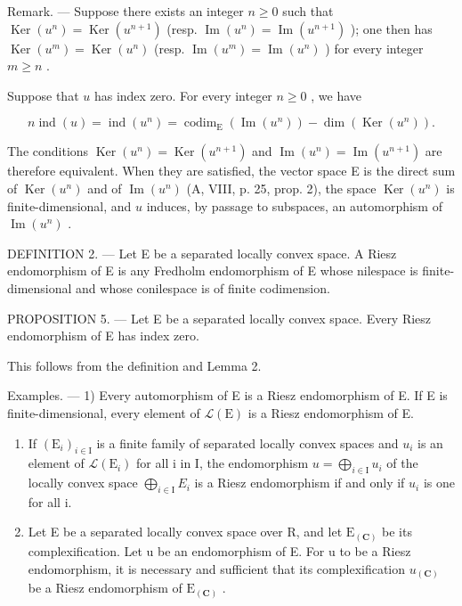 Remark. --- Suppose there exists an integer \(n \geqslant 0\) such that \(\operatorname{Ker}(u^{n}) = \operatorname{Ker}(u^{n+1})\) (resp. \(\operatorname{Im}(u^{n}) = \operatorname{Im}(u^{n+1})\) ); one then has \(\operatorname{Ker}(u^{m}) = \operatorname{Ker}(u^{n})\) (resp. \(\operatorname{Im}(u^{m}) = \operatorname{Im}(u^{n})\) ) for every integer \(m \geqslant n\) .

Suppose that \(u\) has index zero. For every integer \(n \geqslant 0\) , we have

\[
n \operatorname{ind} (u) = \operatorname{ind} \left(u ^ {n}\right) = \operatorname{codim} _ {\mathrm{E}} \left(\operatorname{Im} \left(u ^ {n}\right)\right) - \dim \left(\operatorname{Ker} \left(u ^ {n}\right)\right).
\]

The conditions \(\operatorname{Ker}(u^n) = \operatorname{Ker}(u^{n+1})\) and \(\operatorname{Im}(u^n) = \operatorname{Im}(u^{n+1})\) are therefore equivalent. When they are satisfied, the vector space E is the direct sum of \(\operatorname{Ker}(u^n)\) and of \(\operatorname{Im}(u^n)\) (A, VIII, p. 25, prop. 2), the space \(\operatorname{Ker}(u^n)\) is finite-dimensional, and \(u\) induces, by passage to subspaces, an automorphism of \(\operatorname{Im}(u^n)\) .

DEFINITION 2. --- Let E be a separated locally convex space. A Riesz endomorphism of E is any Fredholm endomorphism of E whose nilespace is finite-dimensional and whose conilespace is of finite codimension.

PROPOSITION 5. --- Let E be a separated locally convex space. Every Riesz endomorphism of E has index zero.

This follows from the definition and Lemma 2.

Examples. --- 1) Every automorphism of E is a Riesz endomorphism of E. If E is finite-dimensional, every element of \(\mathcal{L}(\mathrm{E})\) is a Riesz endomorphism of E.

\begin{enumerate}
\def\labelenumi{\arabic{enumi})}
\setcounter{enumi}{1}
\item
   If \((\mathrm{E}_{i})_{i\in\mathrm{I}}\) is a finite family of separated locally convex spaces and \(u_{i}\) is an element of \(\mathcal{L}(\mathrm{E}_{i})\) for all i in I, the endomorphism \(u=\bigoplus_{i\in\mathrm{I}}u_{i}\) of the locally convex space \(\bigoplus_{i\in\mathrm{I}}E_{i}\) is a Riesz endomorphism if and only if \(u_{i}\) is one for all i.
\item
   Let E be a separated locally convex space over R, and let \(\mathrm{E}_{(\mathbf{C})}\) be its complexification. Let u be an endomorphism of E. For u to be a Riesz endomorphism, it is necessary and sufficient that its complexification \(u_{(\mathbf{C})}\) be a Riesz endomorphism of \(\mathrm{E}_{(\mathbf{C})}\) .
\end{enumerate}

